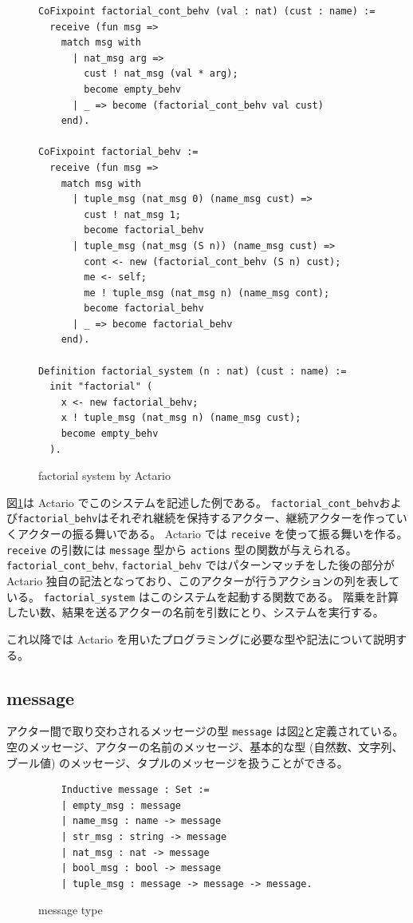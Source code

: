 \begin{figure}[t]
  \begin{lstlisting}
CoFixpoint factorial_cont_behv (val : nat) (cust : name) :=
  receive (fun msg =>
    match msg with
      | nat_msg arg =>
        cust ! nat_msg (val * arg);
        become empty_behv
      | _ => become (factorial_cont_behv val cust)
    end).

CoFixpoint factorial_behv :=
  receive (fun msg =>
    match msg with
      | tuple_msg (nat_msg 0) (name_msg cust) =>
        cust ! nat_msg 1;
        become factorial_behv
      | tuple_msg (nat_msg (S n)) (name_msg cust) =>
        cont <- new (factorial_cont_behv (S n) cust);
        me <- self;
        me ! tuple_msg (nat_msg n) (name_msg cont);
        become factorial_behv
      | _ => become factorial_behv
    end).

Definition factorial_system (n : nat) (cust : name) :=
  init "factorial" (
    x <- new factorial_behv;
    x ! tuple_msg (nat_msg n) (name_msg cust);
    become empty_behv
  ).
  \end{lstlisting}
  \caption{factorial system by Actario}\label{coq:fact}
\end{figure}


図\ref{coq:fact}は Actario でこのシステムを記述した例である。
\texttt{factorial\_cont\_behv}および\texttt{factorial\_behv}はそれぞれ継続を保持するアクター、継続アクターを作っていくアクターの振る舞いである。
Actario では \texttt{receive} を使って振る舞いを作る。
\texttt{receive} の引数には \texttt{message} 型から \texttt{actions} 型の関数が与えられる。
\texttt{factorial\_cont\_behv}, \texttt{factorial\_behv} ではパターンマッチをした後の部分が Actario 独自の記法となっており、このアクターが行うアクションの列を表している。
\texttt{factorial\_system} はこのシステムを起動する関数である。
階乗を計算したい数、結果を送るアクターの名前を引数にとり、システムを実行する。

これ以降では Actario を用いたプログラミングに必要な型や記法について説明する。

\subsection{message}
アクター間で取り交わされるメッセージの型 \texttt{message} は図\ref{coq:message}と定義されている。
空のメッセージ、アクターの名前のメッセージ、基本的な型 (自然数、文字列、ブール値) のメッセージ、タプルのメッセージを扱うことができる。

\begin{figure}[tb]
  \begin{lstlisting}
    Inductive message : Set :=
    | empty_msg : message
    | name_msg : name -> message
    | str_msg : string -> message
    | nat_msg : nat -> message
    | bool_msg : bool -> message
    | tuple_msg : message -> message -> message.
  \end{lstlisting}
  \caption{message type}\label{coq:message}
\end{figure}


